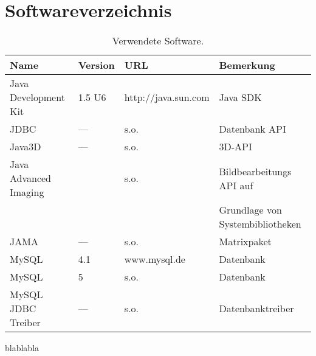 \chapter*{Softwareverzeichnis}
\label{Softwareverzeichnis}
\begin{table}[htb]
	\centering
		\begin{tabular}{|l|l||l|l|}
		\hline
			\bfseries{Name} & \bfseries{Version} & \bfseries{URL} & \bfseries{Bemerkung}\\
		\hline
		\hline
			Java Development Kit & 1.5 U6 & http://java.sun.com& Java SDK\\
		\hline
			JDBC & --- & s.o. & Datenbank API\\
		\hline
			Java3D & --- & s.o. & 3D-API \\
		\hline
			Java Advanced Imaging & & s.o. & Bildbearbeitungs API auf \\& & &Grundlage von Systembibliotheken\\
		\hline
			JAMA & --- & s.o.  & Matrixpaket\\
		\hline
			MySQL & 4.1& www.mysql.de & Datenbank\\
		\hline
			MySQL & 5& s.o.& Datenbank\\
		\hline
			MySQL JDBC Treiber & --- & s.o. & Datenbanktreiber \\
		\hline
		\end{tabular}
	\caption{Verwendete Software.}
	\label{tab:VerwendeteSoftware}
\end{table}

blablabla